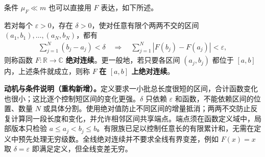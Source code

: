 \documentclass[../../main.tex]{subfiles}%
\begin{document}
条件 $\mu_F\ll m$ 也可以直接用 $F$ 表达，如下所述。
\begin{definition}[函数的绝对连续性]\label{definition:ch03-function-absolute-continuity}
若对每个 $\varepsilon>0$，存在 $\delta>0$，使对任意有限个两两不交的区间 $(a_1,b_1),\ldots,(a_N,b_N)$，都有
\begin{align}\label{align:ch03-function-absolute-continuity}
\sum_{j=1}^N(b_j-a_j)<\delta
\quad\Longrightarrow\quad
\sum_{j=1}^N|F(b_j)-F(a_j)|<\varepsilon,
\end{align}
则称函数 $F:\mathbb R\to\mathbb C$ \textbf{绝对连续}。更一般地，若只要各区间 $(a_j,b_j)$ 都位于 $[a,b]$ 内，上述条件就成立，则称 $F$ \textbf{在 $[a,b]$ 上绝对连续}。
\end{definition}
\begin{remark}
\textbf{动机与条件说明（重构新增）。}定义要求一小批总长度很短的区间，合计函数变化也很小；这比逐个控制短区间的变化更强。$\delta$ 只依赖 $\varepsilon$ 和函数，不能依赖区间的位置、数量 $N$ 或具体分割。使用绝对值防止不同区间的增量抵消；两两不交防止反复计算同一段长度和变化，并允许相邻区间共享端点。端点须在函数定义域中，局部版本只检验 $a\le a_j<b_j\le b$。有限族已足以控制任意长的有限累计和，无需在定义中预先处理无穷级数。全线绝对连续并不要求全线有界变差，例如 $F(x)=x$ 取 $\delta=\varepsilon$ 即满足定义，但全线变差无穷。
\end{remark}
\end{document}
